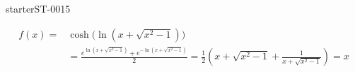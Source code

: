 \begin{corrige}{starterST-0015}
\begin{enumerate}
\begin{equation*}
     \begin{aligned}
       f(x)=&\cosh\Big(\ln(x+\sqrt{x^2-1})\Big)\\
       &=\frac{e^{\ln(x+\sqrt{x^2-1})}+e^{-\ln(x+\sqrt{x^2-1})}}{2} = \frac{1}{2}\left(x+\sqrt{x^2-1} + \frac{1}{x+\sqrt{x^2-1}}\right)=x
     \end{aligned}
   \end{equation*}
\end{enumerate}

\end{corrige}
